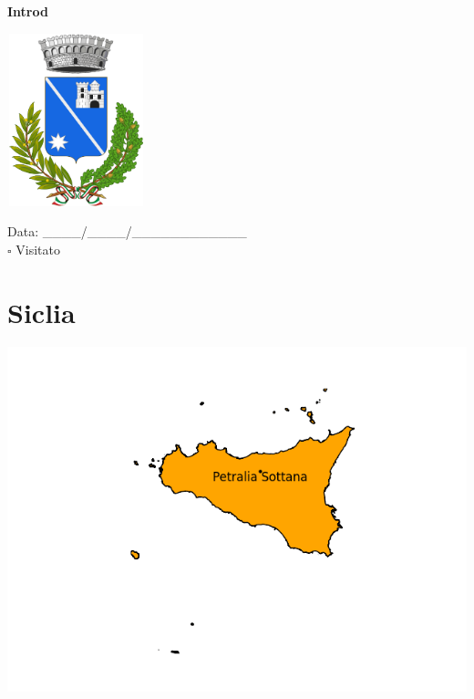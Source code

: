 \documentclass[a5paper,12pt]{article}
\begin{document}
\vspace{0.7cm}

\noindent
\begin{minipage}[t]{0.45\textwidth}
    \begin{center}
        \textbf{Introd}
    \end{center}
    \vspace{-0.5cm} %
    \begin{center}
        \includegraphics[height= 5cm, width=4cm]{Valle d'Aosta/Introd-Stemma.png}
    \end{center}
    \vspace{-0.4cm} %
    \begin{flushleft}
        Data: \_\_\_\_/\_\_\_\_/\_\_\_\_\_\_\_\_\_\_\_\_ \\
        $\square$ Visitato
    \end{flushleft}
\end{minipage}
\hfill
\begin{minipage}[t]{0.45\textwidth}
\end{minipage}


\newpage

\section*{Siclia}

\begin{center} %
	\includegraphics[width=\linewidth]{"Immagini Regione/Sicilia.png"} %
\end{center}
\end{document}
